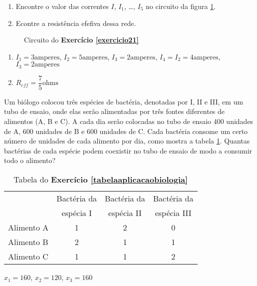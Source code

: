 \documentclass[12pt]{exam}
\begin{document}
\begin{exercicio}\label{exercicio21}
  \begin{enumerate}
    \item Encontre o valor das correntes $I$, $I_1$, \dots, $I_5$ no circuito da figura \ref{exercicio21circuitopoole}.
    \item Econtre a resistência efefiva dessa rede.
  \end{enumerate}
  \begin{figure}
    \centering
    
    \caption{Circuito do \textbf{Exercício \ref{exercicio21}}}
    \label{exercicio21circuitopoole}
  \end{figure}
  \begin{solucao}
    \begin{enumerate}
      \item $I_1 = 3 \mbox{amperes}$, $I_2 = 5 \mbox{amperes}$, $I_3 = 2 \mbox{amperes}$, $I_4 = I_2 =  4\mbox{amperes}$, $I_3 = 2 \mbox{amperes}$
      \item $R_{eff} = \dfrac{7}{5} \mbox{ohms}$
    \end{enumerate}
  \end{solucao}
\end{exercicio}

\begin{exercicio}\label{tabelaaplicacaobiologia}
  Um biólogo colocou três espécies de bactéria, denotadas por I, II e III, em um tubo de ensaio, onde elas serão alimentadas por três fontes diferentes de alimentos (A, B e C). A cada dia serão colocadas no tubo de ensaio 400 unidades de A, 600 unidades de B e 600 unidades de C. Cada bactéria consome um certo número de unidades de cada alimento por dia, como mostra a tabela \ref{tabelabacterias}. Quantas bactérias de cada espécie podem coexistir no tubo de ensaio de modo a consumir todo o alimento?
  \begin{table}[!h]
    \begin{center}
      \begin{tabular}{lccc}
        & Bactéria da & Bactéria da & Bactéria da \\
        & espécia I & espécia II & espécia III\\
        \hline
        Alimento A & 1 & 2 & 0\\
        Alimento B & 2 & 1 & 1\\
        Alimento C & 1 & 1 & 2\\
        \hline
      \end{tabular}
      \caption{Tabela do \textbf{Exercício \ref{tabelaaplicacaobiologia}}}
      \label{tabelabacterias}
    \end{center}
  \end{table}
  \begin{solucao}
    $x_1 = 160$, $x_2 = 120$, $x_3 = 160$
  \end{solucao}
\end{exercicio}
\end{document}
